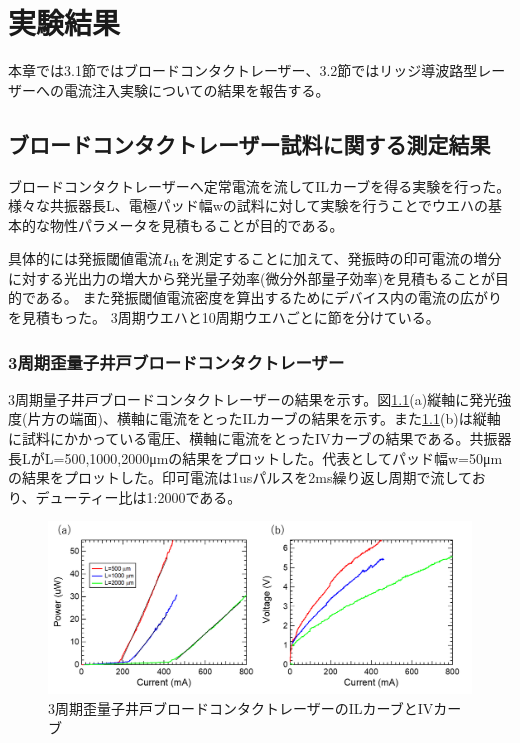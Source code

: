 \chapter{実験結果}
本章では3.1節ではブロードコンタクトレーザー、3.2節ではリッジ導波路型レーザーへの電流注入実験についての結果を報告する。
\section{ブロードコンタクトレーザー試料に関する測定結果}%
ブロードコンタクトレーザーへ定常電流を流してILカーブを得る実験を行った。様々な共振器長L、電極パッド幅wの試料に対して実験を行うことでウエハの基本的な物性パラメータを見積もることが目的である。

具体的には発振閾値電流$I_{\rm{th}}$を測定することに加えて、発振時の印可電流の増分に対する光出力の増大から発光量子効率(微分外部量子効率)を見積もることが目的である。
また発振閾値電流密度を算出するためにデバイス内の電流の広がりを見積もった。
3周期ウエハと10周期ウエハごとに節を分けている。
\subsection{3周期歪量子井戸ブロードコンタクトレーザー}%
3周期量子井戸ブロードコンタクトレーザーの結果を示す。図\ref{fig:fig_3_1_3QW_broacdcontact_IL}(a)縦軸に発光強度(片方の端面)、横軸に電流をとったILカーブの結果を示す。また\ref{fig:fig_3_1_3QW_broacdcontact_IL}(b)は縦軸に試料にかかっている電圧、横軸に電流をとったIVカーブの結果である。共振器長LがL=500,1000,2000\si{\micro\metre}の結果をプロットした。代表としてパッド幅w=50\si{\micro\metre}の結果をプロットした。印可電流は1usパルスを2ms繰り返し周期で流しており、デューティー比は1:2000である。

\begin{figure}[h]
	\centering
	\includegraphics[width=15cm]{figure/fig_3_1_3QW_broadcontact_IL.png}
		\caption{3周期歪量子井戸ブロードコンタクトレーザーのILカーブとIVカーブ}
		\label{fig:fig_3_1_3QW_broacdcontact_IL}
\end{figure}

